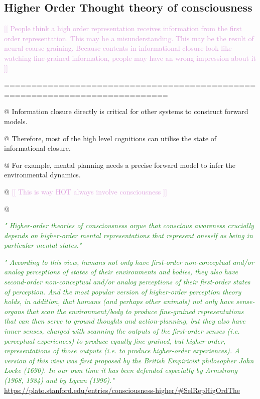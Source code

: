 \documentclass[utf8]{article}
\newenvironment{ants}
			{
			 \begin{easylist}[itemize]		
		 	}
			{
			\end{easylist}
			}
\newcommand{\rewrite}[1]{\textcolor{ForestGreen}{\textit{"#1"}}\newline}
\newcommand{\idea}[2][Plum]{\noindent
				\textcolor{#1}{[[ #2 ]]}}
\begin{document}
		
		

				
			
		\subsection{Higher Order Thought theory of consciousness}	
			\idea{
				People think a high order representation receives information from the first order representation. This may be a misunderstanding. This may be the result of neural coarse-graining. Because contents in informational closure look like watching fine-grained information, people may have an wrong impression about it}
		
			============================================================================			
			\begin{ants}
				@ Information closure directly is critical for other systems to construct forward models. 
				
				@ Therefore, most of the high level cognitions can utilise the state of informational closure.
				
				@ For example, mental planning needs a precise forward model to infer the environmental dynamics. 
				
				@ \idea{This is way HOT always involve consciousness }
				
				@ \cite{rosenthal2005consciousness}
			\end{ants}
		
		
			\rewrite{
				Higher-order theories of consciousness argue that conscious awareness crucially depends on higher-order mental representations that represent oneself as being in particular mental states.} \cite{lau2011empirical}
		
		
			\rewrite{
				According to this view, humans not only have first-order non-conceptual and/or analog perceptions of states of their environments and bodies, they also have second-order non-conceptual and/or analog perceptions of their first-order states of perception. And the most popular version of higher-order perception theory holds, in addition, that humans (and perhaps other animals) not only have sense-organs that scan the environment/body to produce fine-grained representations that can then serve to ground thoughts and action-planning, but they also have inner senses, charged with scanning the outputs of the first-order senses (i.e. perceptual experiences) to produce equally fine-grained, but higher-order, representations of those outputs (i.e. to produce higher-order experiences). A version of this view was first proposed by the British Empiricist philosopher John Locke (1690). In our own time it has been defended especially by Armstrong (1968, 1984) and by Lycan (1996).} \url{https://plato.stanford.edu/entries/consciousness-higher/#SelRepHigOrdThe}
			
\end{document}
